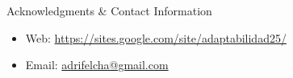 \documentclass[final]{beamer}
\newlength{\onecolwid}
\begin{document}
\begin{frame}[t]
\begin{columns}[t]
\begin{column}{\onecolwid}
\begin{alertblock}{Acknowledgments \& Contact Information}
\small{} \\

\begin{itemize}
\item Web: \href{https://sites.google.com/site/adaptabilidad25/}{https://sites.google.com/site/adaptabilidad25/}
\item Email: \href{mailto:adrifelcha@gmail.com}{adrifelcha@gmail.com}
\end{itemize}


\end{alertblock}
\end{column} %
\end{columns} %
\end{frame} %
\end{document}
